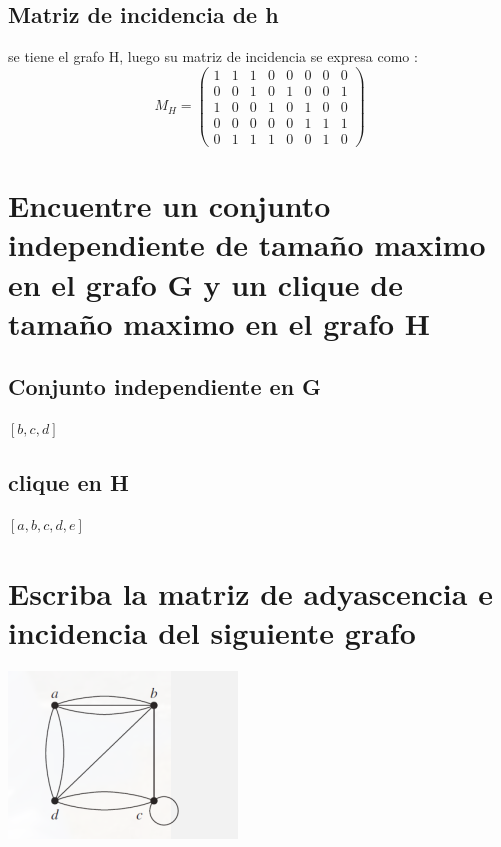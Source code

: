 \documentclass[10pt,a4paper]{article} %
\begin{document}
        \subsection{Matriz de incidencia de h}
            se tiene el grafo H, luego su matriz de incidencia se expresa como :
            \begin{equation}
                M_H = \begin{pmatrix}
                    1 & 1 & 1 & 0 & 0 & 0 & 0 & 0
                    \\ 0 & 0 & 1 & 0 & 1 & 0 & 0 & 1
                    \\ 1 & 0 & 0 & 1 & 0 & 1 & 0 & 0
                    \\ 0 & 0 & 0 & 0 & 0 & 1 & 1 & 1
                    \\ 0 & 1 & 1 & 1 & 0 & 0 & 1 & 0
                \end{pmatrix}
            \end{equation}
    \section{Encuentre un conjunto independiente de tamaño maximo
    en el grafo G y un clique de tamaño maximo en el grafo H}
        \subsection{Conjunto independiente en G}
        $ [b,c,d]  $
        \subsection{clique en H}
        $ [a,b,c,d,e]  $

    \section{Escriba la matriz de adyascencia e incidencia del siguiente grafo}
        \includegraphics[width=0.5\linewidth]{grafo.png}
        \\
\end{document}
